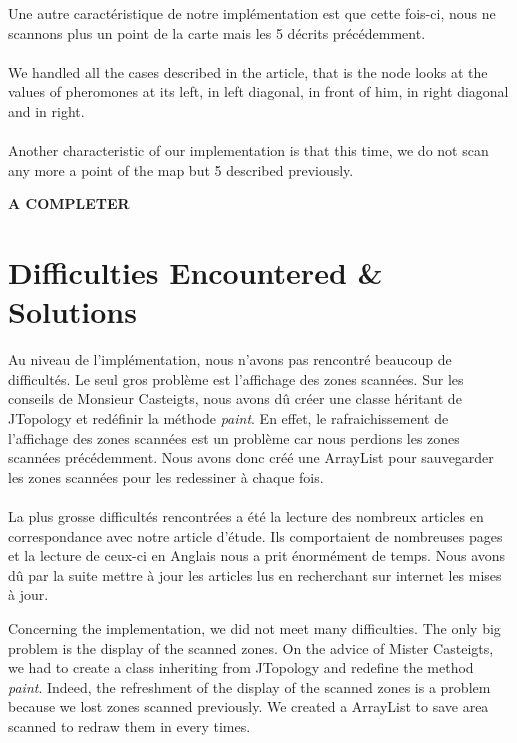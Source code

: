 Une autre caractéristique de notre implémentation est que cette fois-ci, nous ne scannons plus un point de la carte mais les 5 décrits précédemment.\\\\

We handled all the cases described in the article, that is the node looks at the values of pheromones at its left, in left diagonal, in front of him, in right diagonal and in right. \\\\

Another characteristic of our implementation is that this time, we do not scan any more a point of the map but 5 described previously.

\textbf{A COMPLETER}



\section{Difficulties Encountered \& Solutions}

Au niveau de l'implémentation, nous n'avons pas rencontré beaucoup de difficultés. Le seul gros problème est l'affichage des zones scannées. Sur les conseils de Monsieur Casteigts, nous avons dû créer une classe héritant de JTopology et redéfinir la méthode \textit{paint}. En effet, le rafraichissement de l'affichage des zones scannées est un problème car nous perdions les zones scannées précédemment. Nous avons donc créé une ArrayList pour sauvegarder les zones scannées pour les redessiner à chaque fois.\\\\

La plus grosse difficultés rencontrées a été la lecture des nombreux articles en correspondance avec notre article d'étude. Ils comportaient de nombreuses pages et la lecture de ceux-ci en Anglais nous a prit énormément de temps. Nous avons dû par la suite mettre à jour les articles lus en recherchant sur internet les mises à jour.

Concerning the implementation, we did not meet many difficulties. The only big problem is the display of the scanned zones. On the advice of Mister Casteigts, we had to create a class inheriting from JTopology and redefine the method \textit{paint}. Indeed, the refreshment of the display of the scanned zones is a problem because we lost zones scanned previously. We created a ArrayList to save area scanned to redraw them in every times. \\\\
